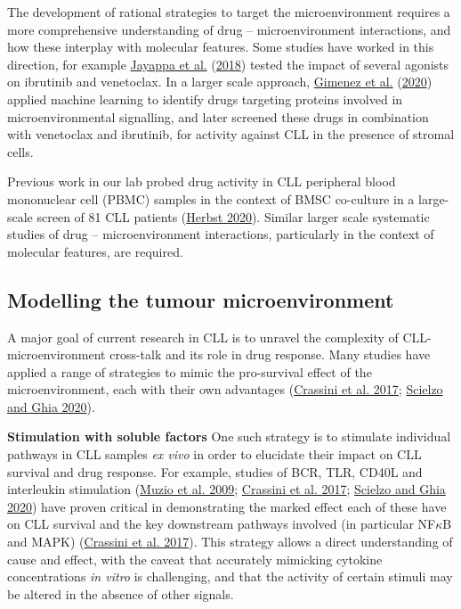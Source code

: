 \documentclass[11pt, a4paper, twosided]{book}
\begin{document}
The development of rational strategies to target the microenvironment requires a more comprehensive understanding of drug -- microenvironment interactions, and how these interplay with molecular features. Some studies have worked in this direction, for example \protect\hyperlink{ref-Jayappa2018}{Jayappa et al.} (\protect\hyperlink{ref-Jayappa2018}{2018}) tested the impact of several agonists on ibrutinib and venetoclax. In a larger scale approach, \protect\hyperlink{ref-Gimenez2020}{Gimenez et al.} (\protect\hyperlink{ref-Gimenez2020}{2020}) applied machine learning to identify drugs targeting proteins involved in microenvironmental signalling, and later screened these drugs in combination with venetoclax and ibrutinib, for activity against CLL in the presence of stromal cells.

Previous work in our lab probed drug activity in CLL peripheral blood mononuclear cell (PBMC) samples in the context of BMSC co-culture in a large-scale screen of 81 CLL patients (\protect\hyperlink{ref-HerbstThesis}{Herbst 2020}). Similar larger scale systematic studies of drug -- microenvironment interactions, particularly in the context of molecular features, are required.

\hypertarget{modelling-microenvironment-intro}{%
\subsection{Modelling the tumour microenvironment}\label{modelling-microenvironment-intro}}

A major goal of current research in CLL is to unravel the complexity of CLL-microenvironment cross-talk and its role in drug response. Many studies have applied a range of strategies to mimic the pro-survival effect of the microenvironment, each with their own advantages (\protect\hyperlink{ref-Crassini2017}{Crassini et al. 2017}; \protect\hyperlink{ref-Scielzo2020}{Scielzo and Ghia 2020}).

\textbf{Stimulation with soluble factors}
One such strategy is to stimulate individual pathways in CLL samples \emph{ex vivo} in order to elucidate their impact on CLL survival and drug response. For example, studies of BCR, TLR, CD40L and interleukin stimulation (\protect\hyperlink{ref-Muzio2009}{Muzio et al. 2009}; \protect\hyperlink{ref-Crassini2017}{Crassini et al. 2017}; \protect\hyperlink{ref-Scielzo2020}{Scielzo and Ghia 2020}) have proven critical in demonstrating the marked effect each of these have on CLL survival and the key downstream pathways involved (in particular NF\(\kappa\)B and MAPK) (\protect\hyperlink{ref-Crassini2017}{Crassini et al. 2017}). This strategy allows a direct understanding of cause and effect, with the caveat that accurately mimicking cytokine concentrations \emph{in vitro} is challenging, and that the activity of certain stimuli may be altered in the absence of other signals.
\end{document}
